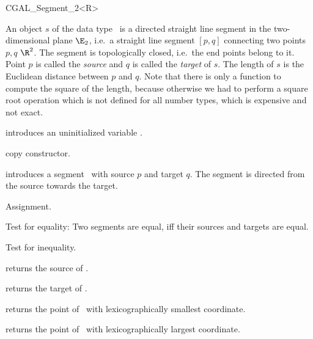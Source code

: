 
\begin{ccClassTemplate} {CGAL_Segment_2<R>}

\ccDefinition  An object $s$ of the data type \ccClassName\ is a directed
straight line segment in the two-dimensional plane $\E_2$, i.e.\ a
straight line segment $[p,q]$ connecting two points $p,q$ 
$\R^2$. The segment is topologically closed, i.e.\  the end
points belong to it. Point $p$ is called the {\em source} and $q$
is called the {\em target} of $s$. The length of $s$ is the
Euclidean distance between $p$ and $q$. Note that there is only a function
to compute the square of the length, because otherwise we had to
perform a square root operation which is not defined for all
number types, which is expensive and not exact.

\ccCreation
{}


\ccHidden {}
             {introduces an uninitialized variable \ccVar.}

\ccHidden {}
 	    {copy constructor.}

            {introduces a segment \ccVar\ with source $p$
             and target $q$. The segment is directed from the source towards
             the target.}


\ccOperations
\ccSetTwoOfThreeColumns{5cm}{4cm}

\ccHidden {}
        {Assignment.}

       {Test for equality: Two segments are equal, iff their sources and
        targets are equal.}

       {Test for inequality.}


       {returns the source of \ccVar.}

       {returns the target of \ccVar.}

       {returns the point of \ccVar\ with lexicographically smallest coordinate.}

       {returns the point of \ccVar\ with lexicographically largest coordinate.}



\end{ccClassTemplate}
